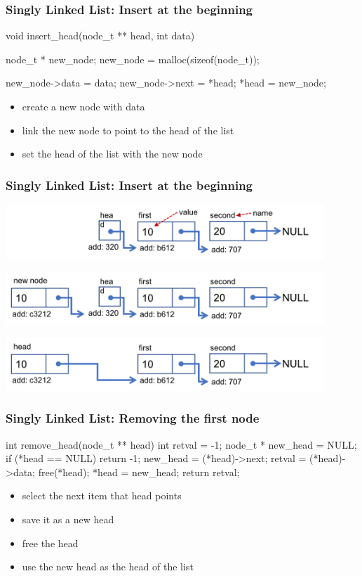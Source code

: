 \documentclass[newPxFont,sthlmFooter,nooffset]{beamer}
\begin{document}
\begin{frame}[t, fragile]
  \frametitle{Singly Linked List: Insert at the beginning}

\begin{ncodedef}
void insert_head(node_t ** head, int data) {
    node_t * new_node;
    new_node = malloc(sizeof(node_t));

    new_node->data = data;
    new_node->next = *head;
    *head = new_node;
}  
\end{ncodedef}
\bigskip
\begin{itemize}
\item create a new node with data
\item link the new node to point to the head of the list
\item set the head of the list with the new node
\end{itemize}

\end{frame}


\begin{frame}[t]
  \frametitle{Singly Linked List: Insert at the beginning}
    \includegraphics[width=0.9\textwidth]{figures/fig06_pointer.png}  

\bigskip
    \includegraphics[width=0.9\textwidth]{figures/fig06_pointer1.png}  

\bigskip
    \includegraphics[width=0.9\textwidth]{figures/fig06_pointer2.png}  
\end{frame}


\begin{frame}[t, fragile]
  \frametitle{Singly Linked List: Removing the first node}

\begin{ncodedef}
int remove_head(node_t ** head) {
    int retval = -1;
    node_t * new_head = NULL;
    if (*head == NULL) {
        return -1;
    }
    new_head = (*head)->next;
    retval = (*head)->data;
    free(*head);
    *head = new_head;
    return retval;
}  
\end{ncodedef}
\begin{itemize}
\item select the next item that head points
\item save it as a new head
\item free the head
\item use the new head as the head of the list
\end{itemize}
\end{frame}
\end{document}
